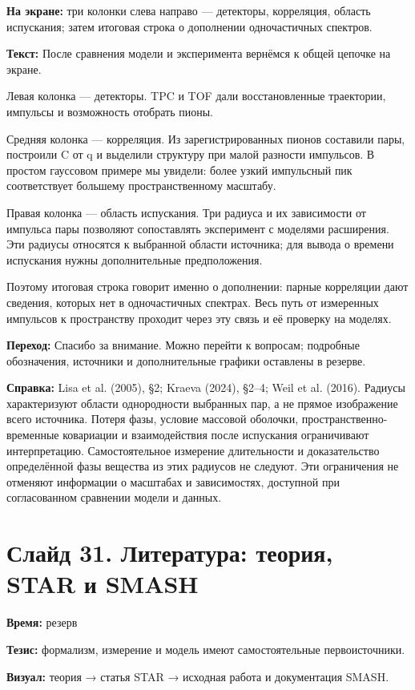 \documentclass[11pt,a4paper]{article}
\begin{document}
\textbf{На экране:} три колонки слева направо — детекторы, корреляция, область испускания; затем итоговая строка о дополнении одночастичных спектров.

\textbf{Текст:} После сравнения модели и эксперимента вернёмся к общей цепочке на экране.

Левая колонка — детекторы. TPC и TOF дали восстановленные траектории, импульсы и возможность отобрать пионы.

Средняя колонка — корреляция. Из зарегистрированных пионов составили пары, построили C от q и выделили структуру при малой разности импульсов. В простом гауссовом примере мы увидели: более узкий импульсный пик соответствует большему пространственному масштабу.

Правая колонка — область испускания. Три радиуса и их зависимости от импульса пары позволяют сопоставлять эксперимент с моделями расширения. Эти радиусы относятся к выбранной области источника; для вывода о времени испускания нужны дополнительные предположения.

Поэтому итоговая строка говорит именно о дополнении: парные корреляции дают сведения, которых нет в одночастичных спектрах. Весь путь от измеренных импульсов к пространству проходит через эту связь и её проверку на моделях.

\textbf{Переход:} Спасибо за внимание. Можно перейти к вопросам; подробные обозначения, источники и дополнительные графики оставлены в резерве.

\textbf{Справка:} Lisa et al. (2005), §2; Kraeva (2024), §2–4; Weil et al. (2016). Радиусы характеризуют области однородности выбранных пар, а не прямое изображение всего источника. Потеря фазы, условие массовой оболочки, пространственно-временные ковариации и взаимодействия после испускания ограничивают интерпретацию. Самостоятельное измерение длительности и доказательство определённой фазы вещества из этих радиусов не следуют. Эти ограничения не отменяют информации о масштабах и зависимостях, доступной при согласованном сравнении модели и данных.

\clearpage
\section*{Слайд 31. Литература: теория, STAR и SMASH}
\textbf{Время:} резерв

\textbf{Тезис:} формализм, измерение и модель имеют самостоятельные первоисточники.

\textbf{Визуал:} теория → статья STAR → исходная работа и документация SMASH.
\end{document}
